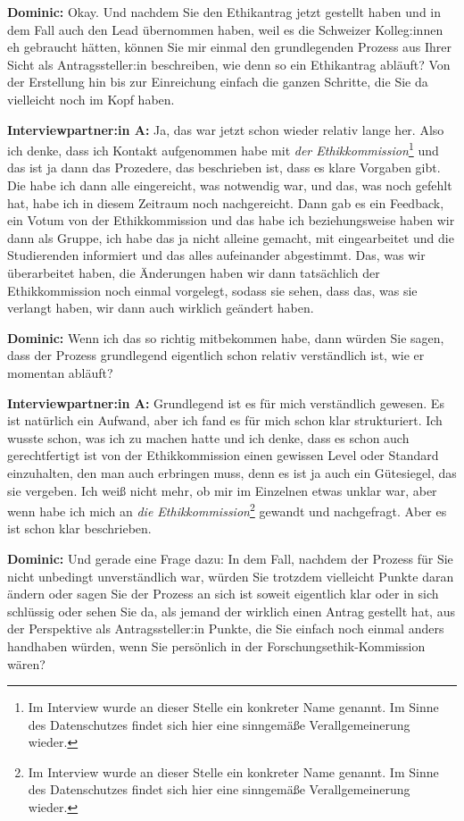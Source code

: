 \documentclass[a4paper,12pt,twoside]{scrreprt}
\begin{document}
\textbf{Dominic:} Okay. Und nachdem Sie den Ethikantrag jetzt gestellt haben und in dem Fall auch den Lead übernommen haben, weil es die Schweizer Kolleg:innen eh gebraucht hätten, können Sie mir einmal den grundlegenden Prozess aus Ihrer Sicht als Antragssteller:in beschreiben, wie denn so ein Ethikantrag abläuft? Von der Erstellung hin bis zur Einreichung einfach die ganzen Schritte, die Sie da vielleicht noch im Kopf haben.

\textbf{Interviewpartner:in A:} Ja, das war jetzt schon wieder relativ lange her. Also ich denke, dass ich Kontakt aufgenommen habe mit \textit{der Ethikkommission}\footnote{Im Interview wurde an dieser Stelle ein konkreter Name genannt. Im Sinne des Datenschutzes findet sich hier eine sinngemäße Verallgemeinerung wieder.} und das ist ja dann das Prozedere, das beschrieben ist, dass es klare Vorgaben gibt. Die habe ich dann alle eingereicht, was notwendig war, und das, was noch gefehlt hat, habe ich in diesem Zeitraum noch nachgereicht. Dann gab es ein Feedback, ein Votum von der Ethikkommission und das habe ich beziehungsweise haben wir dann als Gruppe, ich habe das ja nicht alleine gemacht, mit eingearbeitet und die Studierenden informiert und das alles aufeinander abgestimmt. Das, was wir überarbeitet haben, die Änderungen haben wir dann tatsächlich der Ethikkommission noch einmal vorgelegt, sodass sie sehen, dass das, was sie verlangt haben, wir dann auch wirklich geändert haben.

\textbf{Dominic:} Wenn ich das so richtig mitbekommen habe, dann würden Sie sagen, dass der Prozess grundlegend eigentlich schon relativ verständlich ist, wie er momentan abläuft?

\textbf{Interviewpartner:in A:} Grundlegend ist es für mich verständlich gewesen. Es ist natürlich ein Aufwand, aber ich fand es für mich schon klar strukturiert. Ich wusste schon, was ich zu machen hatte und ich denke, dass es schon auch gerechtfertigt ist von der Ethikkommission einen gewissen Level oder Standard einzuhalten, den man auch erbringen muss, denn es ist ja auch ein Gütesiegel, das sie vergeben. Ich weiß nicht mehr, ob mir im Einzelnen etwas unklar war, aber wenn habe ich mich an \textit{die Ethikkommission}\footnote{Im Interview wurde an dieser Stelle ein konkreter Name genannt. Im Sinne des Datenschutzes findet sich hier eine sinngemäße Verallgemeinerung wieder.} gewandt und nachgefragt. Aber es ist schon klar beschrieben.

\textbf{Dominic:} Und gerade eine Frage dazu: In dem Fall, nachdem der Prozess für Sie nicht unbedingt unverständlich war, würden Sie trotzdem vielleicht Punkte daran ändern oder sagen Sie der Prozess an sich ist soweit eigentlich klar oder in sich schlüssig oder sehen Sie da, als jemand der wirklich einen Antrag gestellt hat, aus der Perspektive als Antragssteller:in Punkte, die Sie einfach noch einmal anders handhaben würden, wenn Sie persönlich in der Forschungsethik-Kommission wären?
\end{document}
